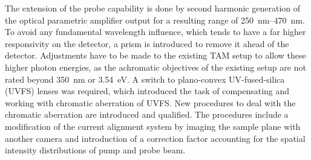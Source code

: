 \documentclass[twoside,openright,listof=numbered]{scrreprt}
\begin{document}
The extension of the probe capability is done by second harmonic generation of the optical parametric amplifier output for a resulting range of \SIrange{250}{470}{\nano\meter}. To avoid any fundamental wavelength influence, which tends to have a far higher responsivity on the detector, a prism is introduced to remove it ahead of the detector. Adjustments have to be made to the existing TAM setup to allow these higher photon energies, as the achromatic objectives of the existing setup are not rated beyond \qty{350}{\nano\meter} or \qty{3.54}{\electronvolt}. A switch to plano-convex UV-fused-silica (UVFS) lenses was required, which introduced the task of compensating and working with chromatic aberration of UVFS. New procedures to deal with the chromatic aberration are introduced and qualified. The procedures include a modification of the current alignment system by imaging the sample plane with another camera and introduction of a correction factor accounting for the spatial intensity distributions of pump and probe beam.
\end{document}
